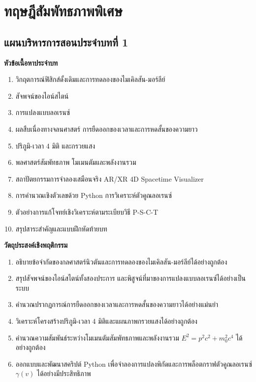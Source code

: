 \chapter{ทฤษฎีสัมพัทธภาพพิเศษ}
\label{chap:special_relativity}

\section*{แผนบริหารการสอนประจำบทที่ 1}

\begin{lessonplanbox}
\noindent\textbf{หัวข้อเนื้อหาประจำบท}
\begin{enumerate}
    \item วิกฤตการณ์ฟิสิกส์ดั้งเดิมและการทดลองของไมเคิลสัน-มอร์ลีย์
    \item สัจพจน์ของไอน์สไตน์
    \item การแปลงแบบลอเรนซ์
    \item ผลสืบเนื่องทางจลนศาสตร์ การยืดออกของเวลาและการหดสั้นของความยาว
    \item ปริภูมิ-เวลา 4 มิติ และกรวยแสง
    \item พลศาสตร์สัมพัทธภาพ โมเมนตัมและพลังงานรวม
    \item สถาปัตยกรรมการจำลองเสมือนจริง AR/XR 4D Spacetime Visualizer
    \item การคำนวณเชิงตัวเลขด้วย Python การวิเคราะห์ตัวคูณลอเรนซ์
    \item ตัวอย่างการแก้โจทย์เชิงวิเคราะห์ตามระเบียบวิธี P-S-C-T
    \item สรุปสาระสำคัญและแบบฝึกหัดท้ายบท
\end{enumerate}

\vspace{0.4em}
\noindent\textbf{วัตถุประสงค์เชิงพฤติกรรม}
\begin{enumerate}
    \item อธิบายข้อจำกัดของกลศาสตร์นิวตันและการทดลองของไมเคิลสัน-มอร์ลีย์ได้อย่างถูกต้อง
    \item สรุปสัจพจน์ของไอน์สไตน์ทั้งสองประการ และพิสูจน์ที่มาของการแปลงแบบลอเรนซ์ได้อย่างเป็นระบบ
    \item คำนวณปรากฏการณ์การยืดออกของเวลาและการหดสั้นของความยาวได้อย่างแม่นยำ
    \item วิเคราะห์โครงสร้างปริภูมิ-เวลา 4 มิติและแผนภาพกรวยแสงได้อย่างถูกต้อง
    \item คำนวณความสัมพันธ์ระหว่างโมเมนตัมสัมพัทธภาพและพลังงานรวม $E^2 = p^2 c^2 + m_0^2 c^4$ ได้อย่างถูกต้อง
    \item ออกแบบและพัฒนาสคริปต์ Python เพื่อจำลองการแปลงพิกัดและการพล็อตกราฟตัวคูณลอเรนซ์ $\gamma(v)$ ได้อย่างมีประสิทธิภาพ
\end{enumerate}


\end{lessonplanbox}
